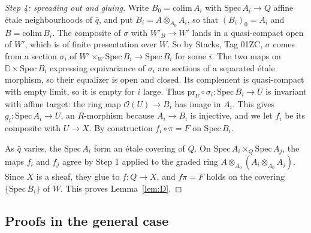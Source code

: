 \begin{proof}[Step 4: spreading out and gluing]
Write $B_0=\mathrm{colim}\,A_i$ with $\mathrm{Spec}\,A_i\to Q$ affine étale neighbourhoods of $\bar{q}$, and put $B_i=A\otimes_{A_0}A_i$, so that $(B_i)_0=A_i$ and $B=\mathrm{colim}\,B_i$. The composite of $\sigma$ with $W'_B\to W'$ lands in a quasi-compact open of $W'$, which is of finite presentation over $W$. So by Stacks, Tag 01ZC, $\sigma$ comes from a section $\sigma_i$ of $W'\times_W\mathrm{Spec}\,B_i\to\mathrm{Spec}\,B_i$ for some $i$. The two maps on $\mathbb{D}\times\mathrm{Spec}\,B_i$ expressing equivariance of $\sigma_i$ are sections of a separated étale morphism, so their equalizer is open and closed. Its complement is quasi-compact with empty limit, so it is empty for $i$ large. Thus $\mathrm{pr}_U\circ\sigma_i\colon\mathrm{Spec}\,B_i\to U$ is invariant with affine target: the ring map $\mathcal{O}(U)\to B_i$ has image in $A_i$. This gives $g_i\colon\mathrm{Spec}\,A_i\to U$, an $R$-morphism because $A_i\to B_i$ is injective, and we let $f_i$ be its composite with $U\to X$. By construction $f_i\circ\pi=F$ on $\mathrm{Spec}\,B_i$.

As $\bar{q}$ varies, the $\mathrm{Spec}\,A_i$ form an étale covering of $Q$. On $\mathrm{Spec}\,A_i\times_Q\mathrm{Spec}\,A_j$, the maps $f_i$ and $f_j$ agree by Step 1 applied to the graded ring $A\otimes_{A_0}(A_i\otimes_{A_0}A_j)$. Since $X$ is a sheaf, they glue to $f\colon Q\to X$, and $f\pi=F$ holds on the covering $\{\mathrm{Spec}\,B_i\}$ of $W$. This proves Lemma~\ref{lem:D}.
\end{proof}

\subsection{Proofs in the general case}\label{subsec:reductions}

